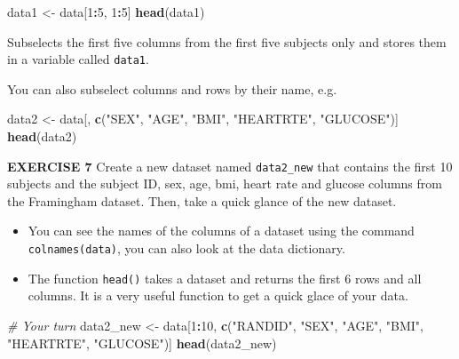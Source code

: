 \documentclass[
]{article}
\newenvironment{Shaded}{\begin{snugshade}}{\end{snugshade}}
\newcommand{\CommentTok}[1]{\textcolor[rgb]{0.56,0.35,0.01}{\textit{#1}}}
\newcommand{\DecValTok}[1]{\textcolor[rgb]{0.00,0.00,0.81}{#1}}
\newcommand{\KeywordTok}[1]{\textcolor[rgb]{0.13,0.29,0.53}{\textbf{#1}}}
\newcommand{\NormalTok}[1]{#1}
\newcommand{\OperatorTok}[1]{\textcolor[rgb]{0.81,0.36,0.00}{\textbf{#1}}}
\newcommand{\StringTok}[1]{\textcolor[rgb]{0.31,0.60,0.02}{#1}}
\begin{document}
\begin{Shaded}
\begin{Highlighting}[]
\NormalTok{data1 <-}\StringTok{ }\NormalTok{data[}\DecValTok{1}\OperatorTok{:}\DecValTok{5}\NormalTok{, }\DecValTok{1}\OperatorTok{:}\DecValTok{5}\NormalTok{]}
\KeywordTok{head}\NormalTok{(data1)}
\end{Highlighting}
\end{Shaded}

Subselects the first five columns from the first five subjects only and
stores them in a variable called \texttt{data1}.

You can also subselect columns and rows by their name, e.g.

\begin{Shaded}
\begin{Highlighting}[]
\NormalTok{data2 <-}\StringTok{ }\NormalTok{data[, }\KeywordTok{c}\NormalTok{(}\StringTok{"SEX"}\NormalTok{, }\StringTok{"AGE"}\NormalTok{, }\StringTok{"BMI"}\NormalTok{, }\StringTok{"HEARTRTE"}\NormalTok{, }\StringTok{"GLUCOSE"}\NormalTok{)]}
\KeywordTok{head}\NormalTok{(data2)}
\end{Highlighting}
\end{Shaded}

\textbf{EXERCISE 7} Create a new dataset named \texttt{data2\_new} that
contains the first 10 subjects and the subject ID, sex, age, bmi, heart
rate and glucose columns from the Framingham dataset. Then, take a quick
glance of the new dataset.

\begin{itemize}
\item
  You can see the names of the columns of a dataset using the command
  \texttt{colnames(data)}, you can also look at the data dictionary.
\item
  The function \texttt{head()} takes a dataset and returns the first 6
  rows and all columns. It is a very useful function to get a quick
  glace of your data.
\end{itemize}

\begin{Shaded}
\begin{Highlighting}[]
\CommentTok{# Your turn}
\NormalTok{data2_new <-}\StringTok{ }\NormalTok{data[}\DecValTok{1}\OperatorTok{:}\DecValTok{10}\NormalTok{, }
                  \KeywordTok{c}\NormalTok{(}\StringTok{"RANDID"}\NormalTok{, }\StringTok{"SEX"}\NormalTok{, }\StringTok{"AGE"}\NormalTok{, }\StringTok{"BMI"}\NormalTok{, }
                    \StringTok{"HEARTRTE"}\NormalTok{, }\StringTok{"GLUCOSE"}\NormalTok{)]}
\KeywordTok{head}\NormalTok{(data2_new)}
\end{Highlighting}
\end{Shaded}
\end{document}
